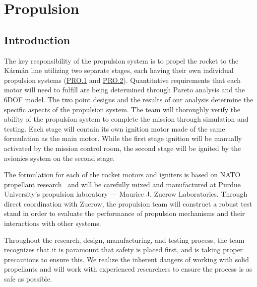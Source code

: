 \section{Propulsion} \label{section:propulsion}
\subsection{Introduction}

The key responsibility of the propulsion system is to propel the rocket to the K\'{a}rm\'{a}n line utilizing two separate stages, each having their own individual propulsion systems (\hyperlink{PRO.1}{PRO.1} and \hyperlink{PRO.2}{PRO.2}). Quantitative requirements that each motor will need to fulfill are being determined through Pareto analysis and the 6DOF model. The two point designs and the results of our analysis determine the specific aspects of the propulsion system. The team will thoroughly verify the ability of the propulsion system to complete the mission through simulation and testing. Each stage will contain its own ignition motor made of the same formulation as the main motor. While the first stage ignition will be manually activated by the mission control room, the second stage will be ignited by the avionics system on the second stage.

The formulation for each of the rocket motors and igniters is based on NATO propellant research~\cite{butacene} and will be carefully mixed and manufactured at Purdue University's propulsion laboratory --- Maurice J. Zucrow Laboratories. Through direct coordination with Zucrow, the propulsion team will construct a robust test stand in order to evaluate the performance of propulsion mechanisms and their interactions with other systems.

Throughout the research, design, manufacturing, and testing process, the team recognizes that it is paramount that safety is placed first, and is taking proper precautions to ensure this. We realize the inherent dangers of working with solid propellants and will work with experienced researchers to ensure the process is as safe as possible.


